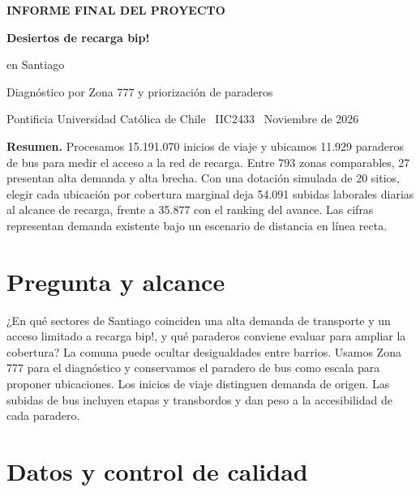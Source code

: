 \documentclass[11pt,a4paper]{article}
\begin{document}
{\sffamily\bfseries\color{acento} INFORME FINAL DEL PROYECTO}\par\medskip
{\sffamily\bfseries\color{tinta}\fontsize{32}{37}\selectfont
Desiertos de recarga bip!\par en Santiago\par}
\medskip
{\large\color{pizarra} Diagnóstico por Zona 777 y priorización de paraderos}\par
{\small Pontificia Universidad Católica de Chile \textperiodcentered\ IIC2433 \textperiodcentered\ Noviembre de 2026}\par
\vspace{5pt}

\begingroup
\setlength{\fboxsep}{10pt}
\colorbox{fondo}{\begin{minipage}{\dimexpr\linewidth-2\fboxsep\relax}
\textbf{Resumen.} Procesamos 15.191.070 inicios de viaje y ubicamos 11.929 paraderos de bus para medir el acceso a la red de recarga. Entre 793 zonas comparables, 27 presentan alta demanda y alta brecha. Con una dotación simulada de 20 sitios, elegir cada ubicación por cobertura marginal deja 54.091 subidas laborales diarias al alcance de recarga, frente a 35.877 con el ranking del avance. Las cifras representan demanda existente bajo un escenario de distancia en línea recta.
\end{minipage}}\par
\endgroup

\section{Pregunta y alcance}

¿En qué sectores de Santiago coinciden una alta demanda de transporte y un acceso limitado a recarga bip!, y qué paraderos conviene evaluar para ampliar la cobertura? La comuna puede ocultar desigualdades entre barrios. Usamos Zona 777 para el diagnóstico y conservamos el paradero de bus como escala para proponer ubicaciones. Los inicios de viaje distinguen demanda de origen. Las subidas de bus incluyen etapas y transbordos y dan peso a la accesibilidad de cada paradero.

\section{Datos y control de calidad}
\end{document}

